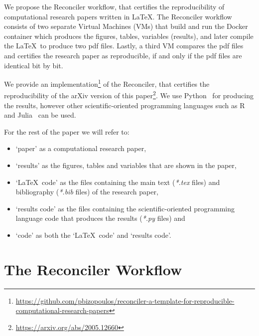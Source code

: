 \documentclass[journal]{IEEEtran}
\begin{document}
We propose the Reconciler workflow, that certifies the reproducibility of computational research papers written in \LaTeX.
The Reconciler workflow consists of two separate Virtual Machines (VMs) that build and run the Docker container which produces the figures, tables, variables (results), and later compile the \LaTeX\ to produce two pdf files.
Lastly, a third VM compares the pdf files and certifies the research paper as reproducible, if and only if the pdf files are identical bit by bit.

We provide an implementation\footnote{\url{https://github.com/pbizopoulos/reconciler-a-template-for-reproducible-computational-research-papers}} of the Reconciler, that certifies the reproducibility of the arXiv version of this paper\footnote{\url{https://arxiv.org/abs/2005.12660}}.
We use Python~\cite{van2007python} for producing the results, however other scientific-oriented programming languages such as R~\cite{ihaka1996r} and Julia~\cite{bezanson2017julia} can be used.

For the rest of the paper we will refer to:
\begin{itemize}
	\item `paper' as a computational research paper,
	\item `results' as the figures, tables and variables that are shown in the paper,
	\item `\LaTeX\ code' as the files containing the main text (\textit{*.tex} files) and bibliography (\textit{*.bib} files) of the research paper,
	\item `results code' as the files containing the scientific-oriented programming language code that produces the results (\textit{*.py} files) and
	\item `code' as both the `\LaTeX\ code' and `results code'.
\end{itemize}

\section{The Reconciler Workflow}
\end{document}
